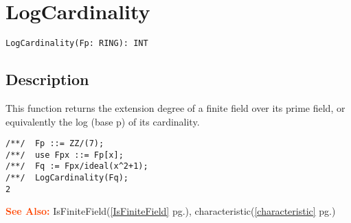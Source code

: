 \documentclass[a4paper]{mybook}
\newenvironment{command}{}{} %
\newcommand\SeeAlso{\par\textcolor{OrangeRed}{\textbf{\large See Also: }}}
\begin{document}
\section{LogCardinality}
\label{LogCardinality}
\begin{command} %


\begin{Verbatim}[label=syntax, rulecolor=\color{MidnightBlue},
frame=single]
LogCardinality(Fp: RING): INT
\end{Verbatim}


\subsection*{Description}

This function returns the extension degree of a finite field over its
prime field, or equivalently the log (base p) of its cardinality.
\begin{Verbatim}[label=example, rulecolor=\color{PineGreen}, frame=single]
/**/  Fp ::= ZZ/(7);
/**/  use Fpx ::= Fp[x];
/**/  Fq := Fpx/ideal(x^2+1);
/**/  LogCardinality(Fq);
2
\end{Verbatim}


\SeeAlso %
  IsFiniteField(\ref{IsFiniteField} pg.\pageref{IsFiniteField}), 
    characteristic(\ref{characteristic} pg.\pageref{characteristic})
\end{command} %
\end{document}
